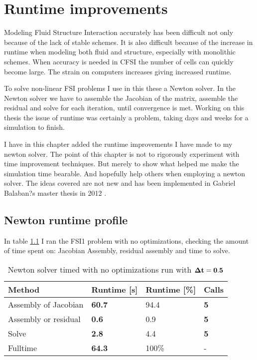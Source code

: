 \chapter{Runtime improvements}\label{runtime}
Modeling Fluid Structure Interaction accurately has been difficult not only because of the lack of stable schemes. It is also difficult because of the increase in runtime when modeling both fluid and structure, especially with monolithic schemes. When accuracy is needed in CFSI the number of cells can quickly become large. The strain on computers increases giving increased runtime. 

To solve non-linear FSI problems I use in this these a Newton solver. In the Newton solver we have to assemble the Jacobian of the matrix, assemble the residual and solve for each iteration, until convergence is met. Working on this thesis the issue of runtime was certainly a problem, taking days and weeks for a simulation to finish. 

I have in this chapter added the runtime improvements I have made to my newton solver. The point of this chapter is not to rigorously experiment with time improvement techniques. But merely to show what helped me make the simulation time bearable. And hopefully help others when employing a newton solver. The ideas covered are not new and has been implemented in Gabriel Balaban?s master thesis in 2012 \cite{Sciences2012}.

\section{Newton runtime profile}
In table \ref{no_opt} I ran the FSI1 problem with no optimizations, checking the amount of time spent on: Jacobian Assembly, residual assembly and time to solve. 

\begin{table}[H]
\centering
\caption{Newton solver timed with no optimizations run with $\bold{\Delta t = 0.5}$ }
\label{no_opt}
\begin{tabular}{|l|l|l|l|}
\hline
Method               & \textbf{Runtime {{[}}s{{]}}} & Runtime {{[}}\%{{]}} & \textbf{Calls} \\ \hline
Assembly of Jacobian & \textbf{60.7}                    & 94.4                     & \textbf{5}     \\ \hline
Assembly or residual & \textbf{0.6}                     & 0.9                      & \textbf{5}     \\ \hline
Solve                & \textbf{2.8}                     & 4.4                      & \textbf{5}     \\ \hline
Fulltime             & \textbf{64.3}                    & 100\%                    & -                \\ \hline
\end{tabular}
\end{table}

